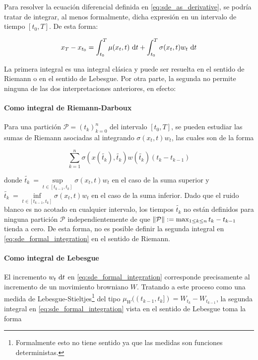 Para resolver la ecuación diferencial definida en \eqref{eq:sde_as_derivative}, se podría tratar de integrar, al menos formalmente, dicha expresión en un intervalo de tiempo $[t_0, T]$. De esta forma:

\begin{equation}
    \label{eq:sde_formal_integration}
    x_T - x_{t_0} = \int_{t_0}^T \mu(x_t,t)\,\operatorname{d}\! t + \int_{t_0}^T \sigma(x_t,t)w_t \,\operatorname{d}\! t
\end{equation}

La primera integral es una integral clásica y puede ser resuelta en el sentido de Riemann o en el sentido de Lebesgue. Por otra parte, la segunda no permite ninguna de las dos interpretaciones anteriores, en efecto:

\paragraph{Como integral de Riemann-Darboux}
Para una partición $\mathcal{P}=(t_k)_{k=0}^n$ del intervalo $[t_0, T]$, se pueden estudiar las sumas de Riemann asociadas al integrando $\sigma(x_t,t)w_t$, las cuales son de la forma

\begin{equation*}
    \sum_{k=1}^n \sigma\left(x(\tilde{t_k}),\tilde{t_k}\right)w\left(\tilde{t_k}\right) (t_k - t_{k-1})
\end{equation*}

donde $\tilde{t_k}\ = \sup\limits_{t\in [t_{k-1}, t_k]} \sigma(x_t,t)w_t$ en el caso de la suma superior y $\tilde{t_k}\ = \inf\limits_{t\in [t_{k-1}, t_k]} \sigma(x_t,t)w_t$ en el caso de la suma inferior. Dado que el ruido blanco es no acotado en cualquier intervalo, los tiempos $\tilde{t_k}$ no están definidos para ninguna partición $\mathcal{P}$ independientemente de que $\left\lVert \mathcal{P} \right\rVert := \max_{1\leq k\leq n} t_k - t_{k-1}$ tienda a cero. De esta forma, no es posible definir la segunda integral en \eqref{eq:sde_formal_integration} en el sentido de Riemann.

\paragraph{Como integral de Lebesgue}
El incremento $w_t \,\operatorname{d}\! t$ en \eqref{eq:sde_formal_integration} corresponde precisamente al incremento de un movimiento browniano $W$. Tratando a este proceso como una medida de Lebesgue-Stieltjes\footnote{Formalmente esto no tiene sentido ya que las medidas son funciones deterministas.} del tipo $\mu_W((t_{k-1}, t_k]) = W_{t_k} - W_{t_{k-1}}$, la segunda integral en \eqref{eq:sde_formal_integration} vista en el sentido de Lebesgue toma la forma

